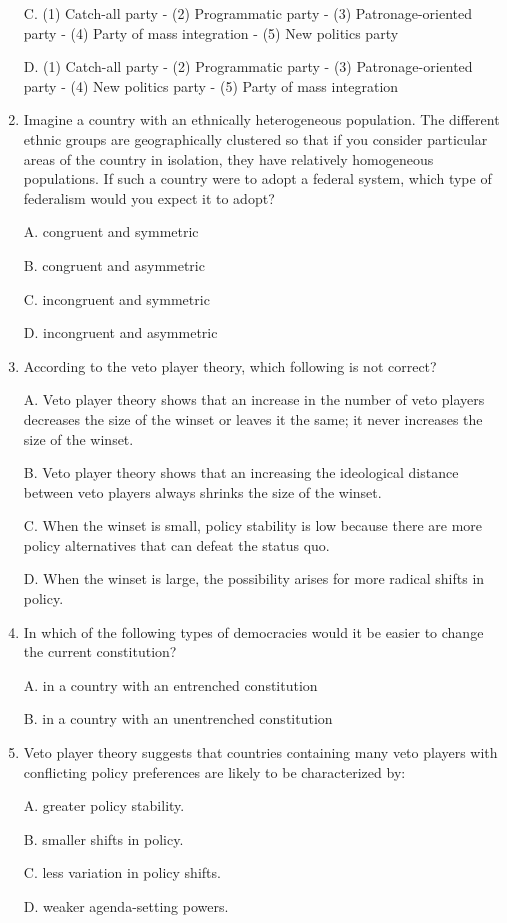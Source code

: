 \documentclass[
]{book}
\begin{document}
\begin{enumerate}
  C. (1) Catch-all party - (2) Programmatic party - (3) Patronage-oriented party - (4) Party of mass integration - (5) New politics party

  D. (1) Catch-all party - (2) Programmatic party - (3) Patronage-oriented party - (4) New politics party - (5) Party of mass integration
\item
  Imagine a country with an ethnically heterogeneous population. The different ethnic groups are geographically clustered so that if you consider particular areas of the country in isolation, they have relatively homogeneous populations. If such a country were to adopt a federal system, which type of federalism would you expect it to adopt?

  A. congruent and symmetric

  B. congruent and asymmetric

  C. incongruent and symmetric

  D. incongruent and asymmetric
\item
  According to the veto player theory, which following is not correct?

  A. Veto player theory shows that an increase in the number of veto players decreases the size of the winset or leaves it the same; it never increases the size of the winset.

  B. Veto player theory shows that an increasing the ideological distance between veto players always shrinks the size of the winset.

  C. When the winset is small, policy stability is low because there are more policy alternatives that can defeat the status quo.

  D. When the winset is large, the possibility arises for more radical shifts in policy.
\item
  In which of the following types of democracies would it be easier to change the current constitution?

  A. in a country with an entrenched constitution

  B. in a country with an unentrenched constitution
\item
  Veto player theory suggests that countries containing many veto players with conflicting policy preferences are likely to be characterized by:

  A. greater policy stability.

  B. smaller shifts in policy.

  C. less variation in policy shifts.

  D. weaker agenda-setting powers.


\end{enumerate}
\end{document}

